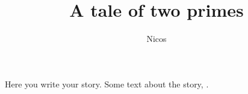 \documentclass{article}
\author{Nicos}
\title{A tale of two primes}
\begin{document}
\maketitle

Here you write your story. Some text about the story, \cite{lamport94}.


 
\end{document}

